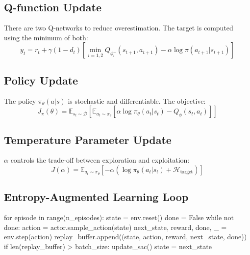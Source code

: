 \documentclass{article}
\begin{document}
\subsection{Q-function Update}

There are two Q-networks to reduce overestimation. The target is computed using the minimum of both:
\begin{equation}
    y_t = r_t + \gamma (1 - d_t) \left[ \min_{i=1,2} Q_{\phi_i^-}(s_{t+1}, a_{t+1}) - \alpha \log \pi(a_{t+1} | s_{t+1}) \right]
\end{equation}

\subsection{Policy Update}

The policy $\pi_\theta(a|s)$ is stochastic and differentiable. The objective:
\begin{equation}
    J_\pi(\theta) = \mathbb{E}_{s_t \sim \mathcal{D}} \left[ \mathbb{E}_{a_t \sim \pi_\theta} \left[ \alpha \log \pi_\theta(a_t | s_t) - Q_\phi(s_t, a_t) \right] \right]
\end{equation}

\subsection{Temperature Parameter Update}

$\alpha$ controls the trade-off between exploration and exploitation:
\begin{equation}
    J(\alpha) = \mathbb{E}_{a_t \sim \pi_\theta} \left[ -\alpha \left( \log \pi_\theta(a_t|s_t) + \mathcal{H}_{\text{target}} \right) \right]
\end{equation}

\subsection{Entropy-Augmented Learning Loop}

\begin{python}
for episode in range(n_episodes):
    state = env.reset()
    done = False
    while not done:
        action = actor.sample_action(state)
        next_state, reward, done, _ = env.step(action)
        replay_buffer.append((state, action, reward, next_state, done))
        if len(replay_buffer) > batch_size:
            update_sac()
        state = next_state
\end{python}
\end{document}
